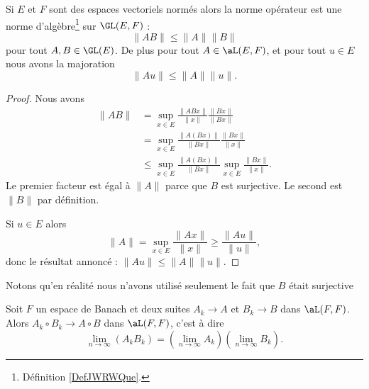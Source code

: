 \begin{proposition} \label{PropEDvSQsA}
    Si \( E\) et \( F\) sont des espaces vectoriels normés alors la norme opérateur est une norme d'algèbre\footnote{Définition \ref{DefJWRWQue}.} sur \( \GL(E,F)\) :
    \begin{equation}
        \| AB \|\leq \| A \|\| B \|
    \end{equation}
    pour tout \( A,B\in\GL(E)\). De plus pour tout \( A\in \aL(E,F)\), et pour tout \( u\in E\) nous avons la majoration
    \begin{equation}
        \| Au \|\leq \| A \|\| u \|.
    \end{equation}
\end{proposition}

\begin{proof}
    Nous avons
    \begin{subequations}
        \begin{align}
            \| AB \|&=\sup_{x\in E}\frac{ \| ABx \| }{ \| x \| }\frac{ \| Bx \| }{ \| Bx \| }\\
            &=\sup_{x\in E}\frac{ \| A(Bx) \| }{ \| Bx \| }\frac{ \| Bx \| }{ \| x \| }\\
            &\leq \sup_{x\in E}\frac{ \| A(Bx) \| }{ \| Bx \| }\sup_{x\in E}\frac{ \| Bx \| }{ \| x \| }.
        \end{align}
    \end{subequations}
    Le premier facteur est égal à \( \| A \|\) parce que \( B\) est surjective. Le second est \( \| B \|\) par définition.

    Si \( u\in E\) alors
    \begin{equation}
        \| A \|=\sup_{x\in E}\frac{ \| Ax \| }{ \| x \| }\geq \frac{ \| Au \| }{ \| u \| },
    \end{equation}
    donc le résultat annoncé : \( \| Au \|\leq \| A \|\| u \|\).
\end{proof}
Notons qu'en réalité nous n'avons utilisé seulement le fait que \( B\) était surjective

\begin{lemma}   \label{LemWWXVSae}
Soit \( F\) un espace de Banach et deux suites \( A_k\to A\) et \( B_k\to B\) dans \( \aL(F,F)\). Alors \( A_k\circ B_k\to A\circ B\) dans \( \aL(F,F)\), c'est à dire
\begin{equation}
    \lim_{n\to \infty} (A_kB_k)=\left( \lim_{n\to \infty} A_k \right)\left( \lim_{n\to \infty} B_k \right).
\end{equation}
\end{lemma}

